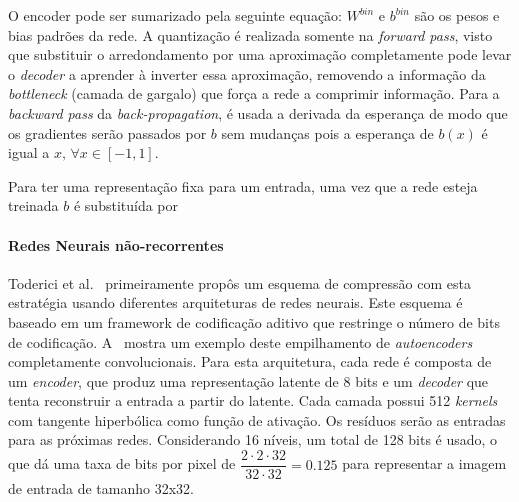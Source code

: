 O encoder pode ser sumarizado pela seguinte equação: $W^{bin}$ e $b^{bin}$ são os pesos e bias padrões da rede. A quantização é realizada somente na \textit{forward pass}, visto que substituir o arredondamento por uma aproximação completamente pode levar o \textit{decoder} a aprender à inverter essa aproximação, removendo a informação da \textit{bottleneck} (camada de gargalo) que força a rede a comprimir informação. Para a \textit{backward pass} da \textit{back-propagation}, é usada a derivada da esperança de modo que os gradientes serão passados por $b$ sem mudanças pois a esperança de $b(x)$ é igual a $x, \, \forall x \in [-1, 1]$. 

Para ter uma representação fixa para um entrada, uma vez que a rede esteja treinada $b$ é substituída por 
\paragraph{Redes Neurais não-recorrentes\\}

Toderici et al.~\cite{Variable2016Toderici} primeiramente propôs um esquema de compressão com esta estratégia usando diferentes arquiteturas de redes neurais. Este esquema é baseado em um framework de codificação aditivo que restringe o número de bits de codificação. A~ mostra um exemplo deste empilhamento de \textit{autoencoders} completamente convolucionais. Para esta arquitetura, cada rede é composta de um \textit{encoder}, que produz uma representação latente de 8 bits e um \textit{decoder} que tenta reconstruir a entrada a partir do latente. Cada camada possui 512 \textit{kernels} com tangente hiperbólica como função de ativação. Os resíduos serão as entradas para as próximas redes. Considerando 16 níveis, um total de 128 bits é usado, o que dá uma taxa de bits por pixel de $\dfrac{2 \cdot 2 \cdot 32}{32 \cdot 32} = 0.125$ para representar a imagem de entrada de tamanho 32x32. 


